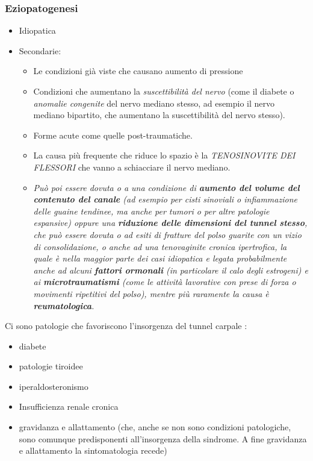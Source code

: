 \subsubsection{Eziopatogenesi}

\begin{itemize}
\item
  Idiopatica
\item
  Secondarie:
\begin{itemize}
\item
  Le condizioni già viste che causano aumento di pressione
\item
  Condizioni che aumentano la \emph{suscettibilità del nervo} (come il diabete o \emph{anomalie congenite} del nervo mediano stesso, ad esempio il nervo mediano bipartito, che aumentano la suscettibilità del nervo stesso).
\item
  Forme acute come quelle post-traumatiche.
\item
  La causa più frequente che riduce lo spazio è la \emph{TENOSINOVITE
  DEI FLESSORI} che vanno a schiacciare il nervo mediano.
\item
  \emph{Può poi essere dovuta o a una condizione di \textbf{\emph{aumento del volume del contenuto del canale}} (ad esempio per \emph{cisti sinoviali} o \emph{infiammazione delle guaine tendinee}, ma anche per \emph{tumori} o per altre \emph{patologie espansive}) oppure una \textbf{\emph{riduzione delle dimensioni del tunnel stesso}}, che può essere dovuta o ad \emph{esiti di fratture del polso} guarite con un vizio di consolidazione, o anche ad una \emph{tenovaginite cronica ipertrofica}, la quale è nella maggior parte dei casi idiopatica e legata probabilmente anche ad alcuni \textbf{fattori ormonali} (in particolare il calo degli estrogeni) e ai \textbf{microtraumatismi} (come le attività lavorative con prese di forza o movimenti ripetitivi del polso), mentre più raramente la causa è \textbf{\emph{reumatologica}}.}
\end{itemize}
\end{itemize}

Ci sono patologie che favoriscono l'insorgenza del tunnel carpale :

\begin{itemize}
\item
  diabete
\item
  patologie tiroidee
\item
  iperaldosteronismo
\item
  Insufficienza renale cronica
\item
  gravidanza e allattamento (che, anche se non sono condizioni patologiche, sono comunque predisponenti all'insorgenza della sindrome. A fine gravidanza e allattamento la sintomatologia recede)
\end{itemize}


